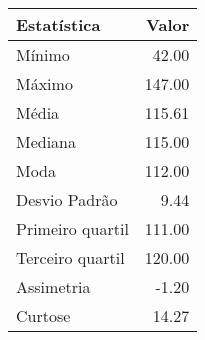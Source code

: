 \begin{table}[ht]
\centering
\begin{tabular}{lr}
  \hline
Estatística & Valor \\ 
  \hline
Mínimo & 42.00 \\ 
  Máximo & 147.00 \\ 
  Média & 115.61 \\ 
  Mediana & 115.00 \\ 
  Moda & 112.00 \\ 
  Desvio Padrão & 9.44 \\ 
  Primeiro quartil & 111.00 \\ 
  Terceiro quartil & 120.00 \\ 
  Assimetria & -1.20 \\ 
  Curtose & 14.27 \\ 
   \hline
\end{tabular}
\end{table}
